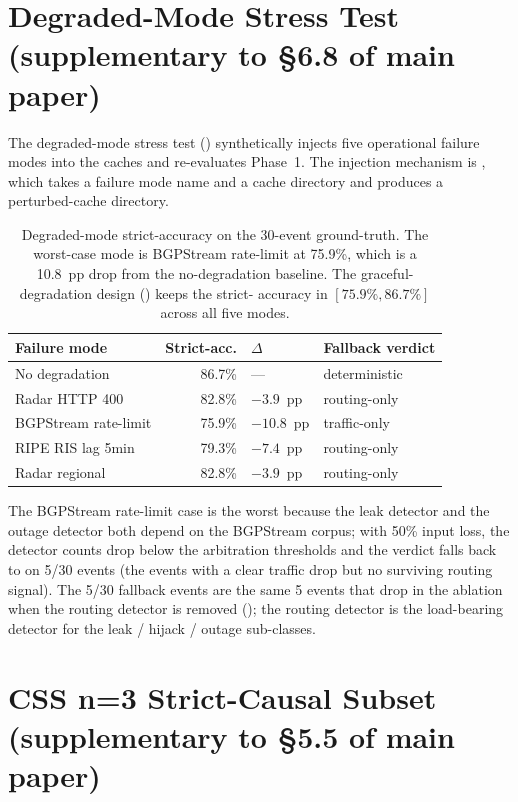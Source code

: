 \documentclass[sigcomm,nonatbib]{acmart}
\begin{document}
\section{Degraded-Mode Stress Test (supplementary to \S6.8 of main paper)}
\label{sec:supp-deg-stress}

The degraded-mode stress test ()
synthetically injects five operational failure modes into
the caches and re-evaluates Phase~1. The injection
mechanism is , which
takes a failure mode name and a cache directory and
produces a perturbed-cache directory.

\begin{table}[t][h]
\centering
\caption{Degraded-mode strict-accuracy on the 30-event
ground-truth. The
worst-case mode is BGPStream rate-limit at 75.9\%,
which is a 10.8~pp drop from the no-degradation
baseline. The graceful-degradation design
() keeps the strict-
accuracy in $[75.9\%, 86.7\%]$ across all five modes.}
\label{tab:supp-deg-stress}
\small
\setlength{\tabcolsep}{3pt}
\begin{tabular}{p{}rp{}p{}}
\hline
Failure mode & Strict-acc. & $\Delta$ & Fallback verdict \\ \hline
No degradation & 86.7\% & --- & deterministic \\
\cf{} Radar HTTP 400 & 82.8\% & $-3.9$~pp & routing-only \\
BGPStream rate-limit & 75.9\% & $-10.8$~pp & traffic-only \\
RIPE RIS lag 5min & 79.3\% & $-7.4$~pp & routing-only \\
\cf{} Radar regional & 82.8\% & $-3.9$~pp & routing-only \\
\hline
\end{tabular}
\end{table}

The BGPStream rate-limit case is the worst because the
leak detector and the outage detector both depend on
the BGPStream corpus; with 50\% input loss, the
detector counts drop below the arbitration thresholds
and the verdict falls back to on
5/30 events (the events with a clear traffic drop
but no surviving routing signal). The 5/30 fallback
events are the same 5 events that drop in the
ablation when the routing detector is removed
(); the routing detector
is the load-bearing detector for the leak / hijack /
outage sub-classes.

\section{CSS n=3 Strict-Causal Subset (supplementary to \S5.5 of main paper)}
\label{sec:supp-css}
\end{document}
